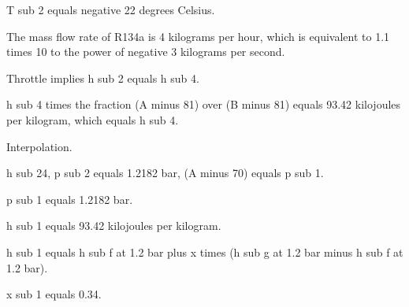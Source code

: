 T sub 2 equals negative 22 degrees Celsius.

The mass flow rate of R134a is 4 kilograms per hour, which is equivalent to 1.1 times 10 to the power of negative 3 kilograms per second.

Throttle implies h sub 2 equals h sub 4.

h sub 4 times the fraction (A minus 81) over (B minus 81) equals 93.42 kilojoules per kilogram, which equals h sub 4.

Interpolation.

h sub 24, p sub 2 equals 1.2182 bar, (A minus 70) equals p sub 1.

p sub 1 equals 1.2182 bar.

h sub 1 equals 93.42 kilojoules per kilogram.

h sub 1 equals h sub f at 1.2 bar plus x times (h sub g at 1.2 bar minus h sub f at 1.2 bar).

x sub 1 equals 0.34.